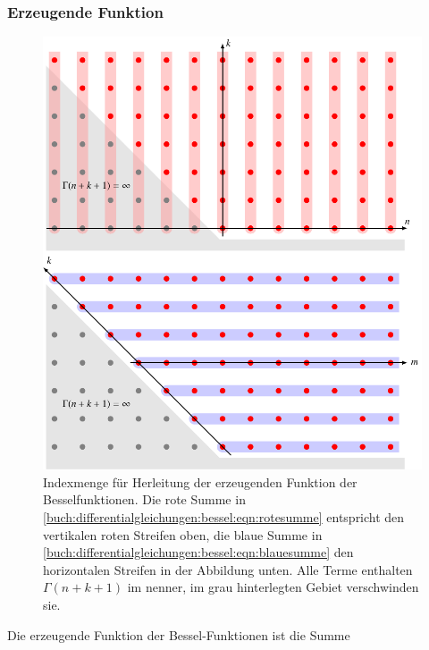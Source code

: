 \subsubsection{Erzeugende Funktion}
\begin{figure}
\centering
\includegraphics{chapters/050-differential/images/besselgrid.pdf}
\caption{Indexmenge für Herleitung der erzeugenden Funktion der
Besselfunktionen.
Die rote Summe in \eqref{buch:differentialgleichungen:bessel:eqn:rotesumme}
entspricht den vertikalen roten Streifen oben,
die blaue Summe in
\eqref{buch:differentialgleichungen:bessel:eqn:blauesumme}
den horizontalen Streifen in der Abbildung unten.
Alle Terme enthalten $\Gamma(n+k+1)$ im nenner,
im grau hinterlegten Gebiet verschwinden sie.
\label{buch:differentialgleichungen:bessel:fig:indexmenge}}
\end{figure}
Die erzeugende Funktion der Bessel-Funktionen ist die Summe
